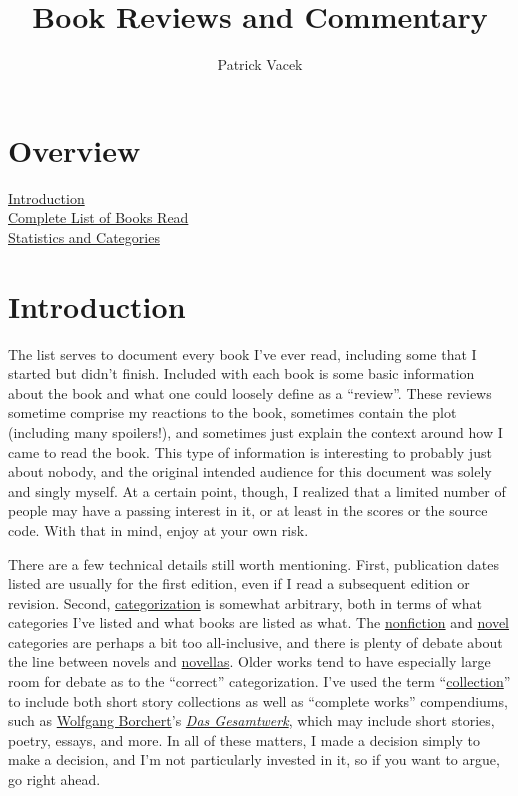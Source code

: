 \documentclass[12pt]{article}
\title{Book Reviews and Commentary}
\author{Patrick Vacek}
\begin{document}
\maketitle

\section*{Overview}
\hyperref[sec:intro]{Introduction} \dotfill \pageref{sec:intro}
\\\indent\hyperref[sec:toc]{Complete List of Books Read} \dotfill \pageref{sec:toc}
\\\indent\hyperref[sec:statistics]{Statistics and Categories} \dotfill \pageref{sec:statistics}


\section*{Introduction} \label{sec:intro}

The list serves to document every book I've ever read, including some that I started but didn't finish. Included with each book is some basic information about the book and what one could loosely define as a ``review''. These reviews sometime comprise my reactions to the book, sometimes contain the plot (including many spoilers!), and sometimes just explain the context around how I came to read the book. This type of information is interesting to probably just about nobody, and the original intended audience for this document was solely and singly myself. At a certain point, though, I realized that a limited number of people may have a passing interest in it, or at least in the scores or the source code. With that in mind, enjoy at your own risk.

There are a few technical details still worth mentioning. First, publication dates listed are usually for the first edition, even if I read a subsequent edition or revision. Second, \hyperref[sec:finished_category]{categorization} is somewhat arbitrary, both in terms of what categories I've listed and what books are listed as what. The \hyperref[category:nonfiction]{nonfiction} and \hyperref[category:novel]{novel} categories are perhaps a bit too all-inclusive, and there is plenty of debate about the line between novels and \hyperref[category:novella]{novellas}. Older works tend to have especially large room for debate as to the ``correct'' categorization. I've used the term ``\hyperref[category:collection]{collection}'' to include both short story collections as well as ``complete works'' compendiums, such as \hyperref[sec:Wolfgang Borchert]{Wolfgang Borchert}'s \textit{\hyperref[sec:Das Gesamtwerk]{Das Gesamtwerk}}, which may include short stories, poetry, essays, and more. In all of these matters, I made a decision simply to make a decision, and I'm not particularly invested in it, so if you want to argue, go right ahead.
\end{document}
